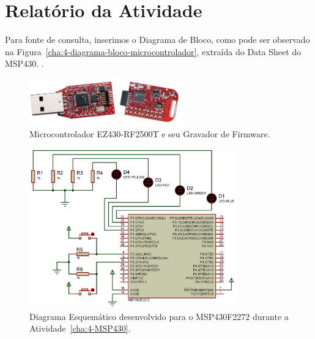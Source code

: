 \documentclass[
	12pt,				%
	openright,			%
  oneside,     %
	a4paper,			%
	english,			%
	french,				%
	spanish,			%
	brazil				%
	]{abntex2}
\begin{document}

\section{Relatório da Atividade} %
\label{sec:consideracoes}

Para fonte de consulta, inserimos o Diagrama de Bloco, como pode ser observado na Figura~\ref{cha:4-diagrama-bloco-microcontrolador}, extraída do Data Sheet do MSP430. \cite{Instruments2012}.

\begin{figure}[!ht]
  \centering
  \caption{\label{fig:03e04MicrocontroladorEZ430-RF2500T}Microcontrolador EZ430-RF2500T e seu Gravador de Firmware.}  
  \includegraphics[width=0.6\textwidth]{images/Atividade04/03e04MicrocontroladorEZ430-RF2500T.jpg}
\end{figure}


\begin{figure}[ht]
  \centering
  \caption{\label{fig:Atividade-04-05-Schematic-01-recortado}Diagrama Esquemático desenvolvido para o MSP430F2272 durante a Atividade~\ref{cha:4-MSP430}.}
  \includegraphics[width=0.8\textwidth]{images/Atividade04/Atividade-04-05-Schematic-01-recortado.png}
\end{figure}
\end{document}
